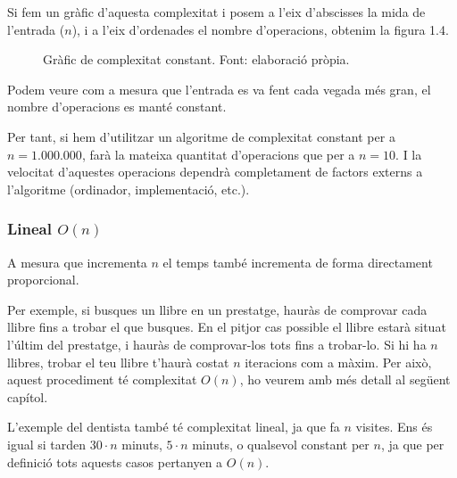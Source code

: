 Si fem un gràfic d'aquesta complexitat i posem a l'eix d'abscisses la mida de l'entrada ($n$), i a l'eix d'ordenades el nombre d'operacions, obtenim la figura 1.4.
\begin{figure}[H]
    \centering
    \caption[Gràfic de complexitat constant.]{Gràfic de complexitat constant. Font: elaboració pròpia.}\label{fig:my_label}
\end{figure}

Podem veure com a mesura que l'entrada es va fent cada vegada més gran, el nombre d'operacions es manté constant.

Per tant, si hem d'utilitzar un algoritme de complexitat constant per a $n = 1.000.000$, farà la mateixa quantitat d'operacions que per a $n = 10$. I la velocitat d'aquestes operacions dependrà completament de factors externs a l'algoritme (ordinador, implementació, etc.).

\subsubsection*{Lineal $O(n)$}
A mesura que incrementa $n$ el temps també incrementa de forma directament proporcional.

Per exemple, si busques un llibre en un prestatge, hauràs de comprovar cada llibre fins a trobar el que busques. En el pitjor cas possible el llibre estarà situat l'últim del prestatge, i hauràs de comprovar-los tots fins a trobar-lo. Si hi ha $n$ llibres, trobar el teu llibre t'haurà costat $n$ iteracions com a màxim. Per això, aquest procediment té complexitat $O(n)$, ho veurem amb més detall al següent capítol.

L'exemple del dentista també té complexitat lineal, ja que fa $n$ visites. Ens és igual si tarden $30 \cdot n$ minuts, $5 \cdot n$ minuts, o qualsevol constant per $n$, ja que per definició tots aquests casos pertanyen a $O(n)$. 

